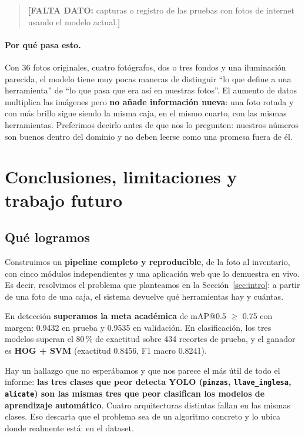 \documentclass[11pt,a4paper]{article}
\newcommand{\clase}[1]{\texttt{#1}}
\begin{document}
\begin{quote}
\small
\textbf{[FALTA DATO:} capturas o registro de las pruebas con fotos de internet usando el modelo
actual.\textbf{]}
\end{quote}

\paragraph{Por qué pasa esto.}
Con 36 fotos originales, cuatro fotógrafos, dos o tres fondos y una iluminación parecida, el modelo
tiene muy pocas maneras de distinguir \enquote{lo que define a una herramienta} de \enquote{lo que
pasa que era así en nuestras fotos}. El aumento de datos multiplica las imágenes pero \textbf{no
añade información nueva}: una foto rotada y con más brillo sigue siendo la misma caja, en el mismo
cuarto, con las mismas herramientas. Preferimos decirlo antes de que nos lo pregunten: nuestros
números son buenos dentro del dominio y no deben leerse como una promesa fuera de él.

\section{Conclusiones, limitaciones y trabajo futuro}
\label{sec:conclusiones}

\subsection{Qué logramos}

Construimos un \textbf{pipeline completo y reproducible}, de la foto al inventario, con cinco
módulos independientes y una aplicación web que lo demuestra en vivo. Es decir, resolvimos el
problema que planteamos en la Sección~\ref{sec:intro}: a partir de una foto de una caja, el sistema
devuelve qué herramientas hay y cuántas.

En detección \textbf{superamos la meta académica} de mAP@0.5 $\geq$ 0.75 con margen: 0.9432 en
prueba y 0.9535 en validación. En clasificación, los tres modelos superan el 80\,\% de exactitud
sobre 434 recortes de prueba, y el ganador es \textbf{HOG + SVM} (exactitud 0.8456, F1 macro
0.8241).

Hay un hallazgo que no esperábamos y que nos parece el más útil de todo el informe: \textbf{las
tres clases que peor detecta YOLO (\clase{pinzas}, \clase{llave\_inglesa}, \clase{alicate}) son las
mismas tres que peor clasifican los modelos de aprendizaje automático}. Cuatro arquitecturas
distintas fallan en las mismas clases. Eso descarta que el problema sea de un algoritmo concreto y
lo ubica donde realmente está: en el dataset.
\end{document}
